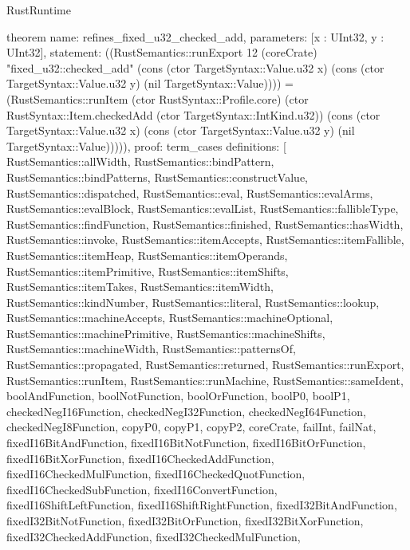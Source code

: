 \begin{lexlean}{RustRuntime}
\begin{semanticmodule}
theorem{
  name: refines_fixed_u32_checked_add,
  parameters: [x : UInt32, y : UInt32],
  statement: ((RustSemantics::runExport 12 (coreCrate) "fixed_u32::checked_add" (cons (ctor TargetSyntax::Value.u32 x) (cons (ctor TargetSyntax::Value.u32 y) (nil TargetSyntax::Value)))) = (RustSemantics::runItem (ctor RustSyntax::Profile.core) (ctor RustSyntax::Item.checkedAdd (ctor TargetSyntax::IntKind.u32)) (cons (ctor TargetSyntax::Value.u32 x) (cons (ctor TargetSyntax::Value.u32 y) (nil TargetSyntax::Value))))),
  proof: term_cases{
    definitions: [
      RustSemantics::allWidth,
      RustSemantics::bindPattern,
      RustSemantics::bindPatterns,
      RustSemantics::constructValue,
      RustSemantics::dispatched,
      RustSemantics::eval,
      RustSemantics::evalArms,
      RustSemantics::evalBlock,
      RustSemantics::evalList,
      RustSemantics::fallibleType,
      RustSemantics::findFunction,
      RustSemantics::finished,
      RustSemantics::hasWidth,
      RustSemantics::invoke,
      RustSemantics::itemAccepts,
      RustSemantics::itemFallible,
      RustSemantics::itemHeap,
      RustSemantics::itemOperands,
      RustSemantics::itemPrimitive,
      RustSemantics::itemShifts,
      RustSemantics::itemTakes,
      RustSemantics::itemWidth,
      RustSemantics::kindNumber,
      RustSemantics::literal,
      RustSemantics::lookup,
      RustSemantics::machineAccepts,
      RustSemantics::machineOptional,
      RustSemantics::machinePrimitive,
      RustSemantics::machineShifts,
      RustSemantics::machineWidth,
      RustSemantics::patternsOf,
      RustSemantics::propagated,
      RustSemantics::returned,
      RustSemantics::runExport,
      RustSemantics::runItem,
      RustSemantics::runMachine,
      RustSemantics::sameIdent,
      boolAndFunction,
      boolNotFunction,
      boolOrFunction,
      boolP0,
      boolP1,
      checkedNegI16Function,
      checkedNegI32Function,
      checkedNegI64Function,
      checkedNegI8Function,
      copyP0,
      copyP1,
      copyP2,
      coreCrate,
      failInt,
      failNat,
      fixedI16BitAndFunction,
      fixedI16BitNotFunction,
      fixedI16BitOrFunction,
      fixedI16BitXorFunction,
      fixedI16CheckedAddFunction,
      fixedI16CheckedMulFunction,
      fixedI16CheckedQuotFunction,
      fixedI16CheckedSubFunction,
      fixedI16ConvertFunction,
      fixedI16ShiftLeftFunction,
      fixedI16ShiftRightFunction,
      fixedI32BitAndFunction,
      fixedI32BitNotFunction,
      fixedI32BitOrFunction,
      fixedI32BitXorFunction,
      fixedI32CheckedAddFunction,
      fixedI32CheckedMulFunction,
}}
\end{semanticmodule}
\end{lexlean}

